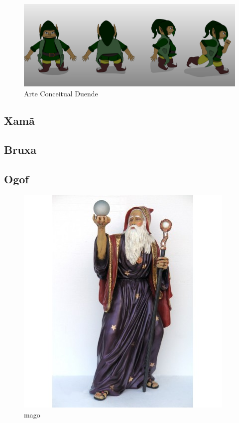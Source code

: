 \begin{figure}[htb]
	\caption{\label{duendePos}Arte Conceitual Duende}
	\begin{center}
	    \includegraphics[width=\textwidth]{imagens/duendePosicoes.jpeg}
	\end{center}
\end{figure}

\clearpage

\subsection{Xamã}

\subsection{Bruxa}

\subsection{Ogof}
\begin{figure}[htb]
	\caption{\label{mago}mago}
	\begin{center}
	    \includegraphics[width=\textwidth/2]{imagens/mago.jpg}
	\end{center}
\end{figure}

